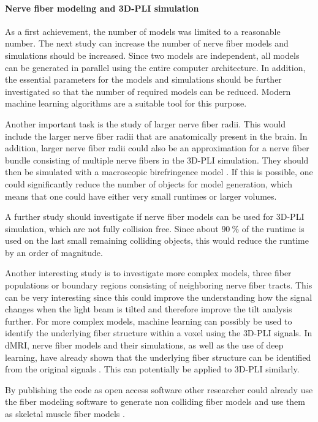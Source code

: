 \paragraph{Nerve fiber modeling and \ac{3D-PLI} simulation}
% 
As a first achievement, the number of models was limited to a reasonable number.
The next study can increase the number of nerve fiber models and simulations should be increased.
Since two models are independent, all models can be generated in parallel using the entire computer architecture.
In addition, the essential parameters for the models and simulations should be further investigated so that the number of required models can be reduced.
Modern machine learning algorithms are a suitable tool for this purpose.
\par
% 
Another important task is the study of larger nerve fiber radii.
This would include the larger nerve fiber radii that are anatomically present in the brain.
In addition, larger nerve fiber radii could also be an approximation for a nerve fiber bundle consisting of multiple nerve fibers in the \ac{3D-PLI} simulation.
They should then be simulated with a macroscopic birefringence model \cite{Menzel2015}.
If this is possible, one could significantly reduce the number of objects for model generation, which means that one could have either very small runtimes or larger volumes.
\par
% 
A further study should investigate if nerve fiber models can be used for \ac{3D-PLI} simulation, which are not fully collision free.
Since about $\SI{90}{\percent}$ of the runtime is used on the last small remaining colliding objects, this would reduce the runtime by an order of magnitude.
\par
% 
Another interesting study is to investigate more complex models, \eg{} three fiber populations or boundary regions consisting of neighboring nerve fiber tracts.
This can be very interesting since this could improve the understanding how the signal changes when the light beam is tilted and therefore improve the tilt analysis further.
For more complex models, machine learning can possibly be used to identify the underlying fiber structure within a voxel using the \ac{3D-PLI} signals. 
In \ac{dMRI}, nerve fiber models and their simulations, as well as the use of deep learning, have already shown that the underlying fiber structure can be identified from the original signals \cite{ginsburgerDis2019}.
This can potentially be applied to \ac{3D-PLI} similarly.
\par
% 
By publishing the code as open access software other researcher could already use the fiber modeling software to generate non colliding fiber models and use them as skeletal muscle fiber models \cite{Ji2021}.